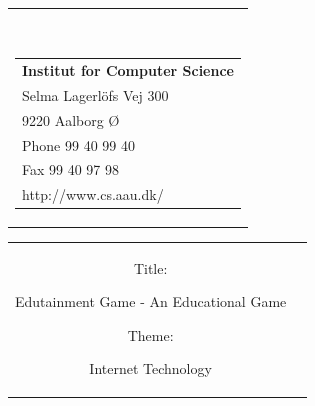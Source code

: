 

{}
\thispagestyle{empty}
\begin{nopagebreak}
{\samepage 
\begin{tabular}{r}
\parbox{\textwidth}{  \\
\hfill \parbox{8cm}{\begin{tabular}{l} %
{\small \textbf{Institut for Computer Science}}\\
{\small Selma Lagerlöfs Vej 300} \\
{\small 9220 Aalborg Ø} \\
{\small Phone 99 40 99 40} \\
{\small Fax 99 40 97 98} \\
{\small http://www.cs.aau.dk/}
\end{tabular}}}

\end{tabular}

\begin{tabular}{cc}
\parbox{7cm}{
\begin{description}

\item { Title:} 

Edutainment Game - An Educational Game\\
  
\item { Theme:} 

Internet Technology

\end{description}

\parbox{8cm}{

}}
\end{tabular}}
\end{nopagebreak}
